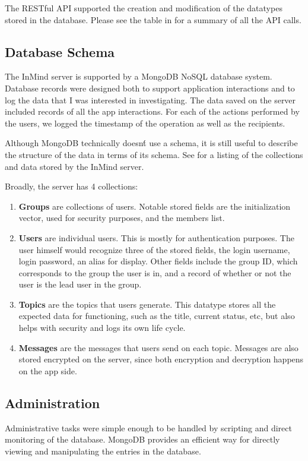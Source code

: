       The RESTful API supported the creation and modification of the datatypes
      stored in the database.
      Please see the table in \cite{} for a summary of all the API calls.

    \subsection{Database Schema}
      The InMind server is supported by a MongoDB NoSQL database system.
      Database records were designed both to support application interactions
      and to log the data that I was interested in investigating.
      The data saved on the server included records of all the app interactions.
      For each of the actions performed by the users,
      we logged the timestamp of the operation as well as the recipients.

      Although MongoDB technically doesn\'t use a schema,
      it is still useful to describe the structure of the data in terms of its schema.
      See \cite{} for a listing of the collections and data stored by
      the InMind server.

      Broadly, the server has 4 collections:
      \begin{enumerate}
      \item \textbf{Groups} are collections of users.
        Notable stored fields are the initialization vector, used for security purposes,
        and the members list.
      \item \textbf{Users} are individual users.
        This is mostly for authentication purposes.
        The user himself would recognize three of the stored fields,
        the login username, login password, an alias for display.
        Other fields include the group ID, which corresponds to the group the user is in,
        and a record of whether or not the user is the lead user in the group.
      \item \textbf{Topics} are the topics that users generate.
        This datatype stores all the expected data for functioning,
        such as the title, current status, etc,
        but also helps with security and logs its own life cycle.
      \item \textbf{Messages} are the messages that users send on each topic.
        Messages are also stored encrypted on the server,
        since both encryption and decryption happens on the app side.
      \end{enumerate}

    \subsection{Administration}
      Administrative tasks were simple enough to be handled by scripting
      and direct monitoring of the database.
      MongoDB provides an efficient way for directly viewing
      and manipulating the entries in the database.

